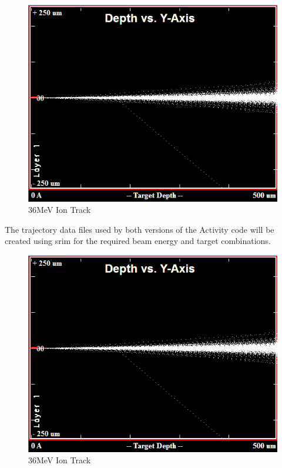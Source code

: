 \begin{figure}[htp]
  \begin{center}
    \includegraphics[scale=0.55]{chapters/activity_code/images/ion_transport.png}
    \caption{36MeV Ion Track}
    \label{graph:graph1}
  \end{center}
\end{figure}

The trajectory data files used by both versions of the Activity code will be created using \acrshort{srim} for the required beam energy and target combinations.

\begin{figure}[htp]
  \begin{center}
    \includegraphics[scale=0.55]{chapters/activity_code/images/ion_transport.png}
    \caption{36MeV Ion Track}
    \label{graph:graph1}
  \end{center}
\end{figure}

